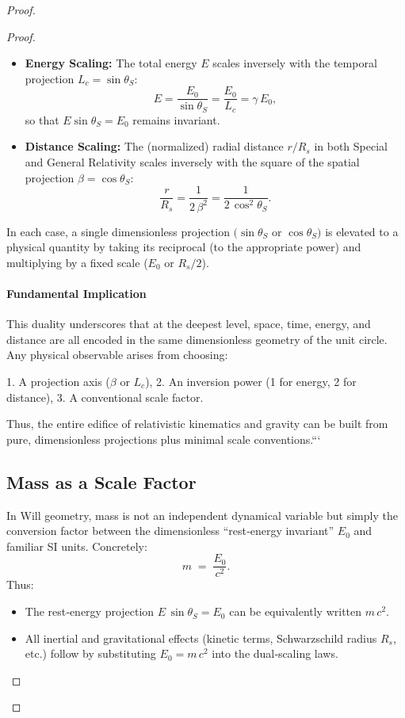 \documentclass{article}
\begin{document}
\begin{proof}
\begin{proof}
\begin{itemize}
  \item \textbf{Energy Scaling:}  
    The total energy \(E\) scales inversely with the temporal projection 
    \(L_c = \sin\theta_S\):
    \[
      E = \frac{E_0}{\sin\theta_S}
        = \frac{E_0}{L_c}
        = \gamma\,E_0,
    \]
    so that \(E\sin\theta_S = E_0\) remains invariant.

  \item \textbf{Distance Scaling:}  
    The (normalized) radial distance \(r/R_s\) in both Special and General Relativity scales inversely with the square of the spatial projection 
    \(\beta = \cos\theta_S\):
    \[
      \frac{r}{R_s}
      = \frac{1}{2\,\beta^2}
      = \frac{1}{2\,\cos^2\theta_S}.
    \]
\end{itemize}

In each case, a single dimensionless projection \((\sin\theta_S\) or \(\cos\theta_S)\) is elevated to a physical quantity by taking its reciprocal (to the appropriate power) and multiplying by a fixed scale (\(E_0\) or \(R_s/2\)).

\paragraph{Fundamental Implication}  
This duality underscores that at the deepest level, space, time, energy, and distance are all encoded in the same dimensionless geometry of the unit circle.  Any physical observable arises from choosing:

1.  A projection axis (\(\beta\) or \(L_c\)),  
2.  An inversion power (1 for energy, 2 for distance),  
3.  A conventional scale factor.  

Thus, the entire edifice of relativistic kinematics and gravity can be built from pure, dimensionless projections plus minimal scale conventions.```


\subsection{Mass as a Scale Factor}

In Will geometry, mass is not an independent dynamical variable but simply
the conversion factor between the dimensionless “rest‐energy invariant”
\(E_0\) and familiar SI units.  Concretely:
\[
  m \;=\;\frac{E_0}{c^2}.
\]
Thus:
\begin{itemize}
  \item The rest‐energy projection \(E\,\sin\theta_S = E_0\)  
        can be equivalently written \(m\,c^2\).
  \item All inertial and gravitational effects (kinetic terms, Schwarzschild radius \(R_s\), etc.) follow by substituting \(E_0 = m\,c^2\) into the dual‐scaling laws.
\end{itemize}




\end{proof}
\end{proof}
\end{document}
